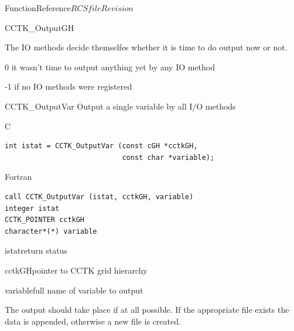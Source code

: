 \begin{cactuspart}{FunctionReference}{$RCSfile$}{$Revision$}
\begin{FunctionDescription}{CCTK\_OutputGH}
\begin{Discussion}
The IO methods decide themselfes whether it is time to do output now or not.
\end{Discussion}

\begin{ErrorSection}
\begin{Error}{\rm 0}
it wasn't time to output anything yet by any IO method
\end{Error}
\begin{Error}{-1}
if no IO methods were registered
\end{Error}
\end{ErrorSection}
\end{FunctionDescription}


\begin{FunctionDescription}{CCTK\_OutputVar}
Output a single variable by all I/O methods
\label{CCTK-OutputVar}

\begin{SynopsisSection}
\begin{Synopsis}{C}
\begin{verbatim}
int istat = CCTK_OutputVar (const cGH *cctkGH,
                            const char *variable);
\end{verbatim}
\end{Synopsis}
\begin{Synopsis}{Fortran}
\begin{verbatim}
call CCTK_OutputVar (istat, cctkGH, variable)
integer istat
CCTK_POINTER cctkGH
character*(*) variable
\end{verbatim}
\end{Synopsis}
\end{SynopsisSection}

\begin{ParameterSection}
\begin{Parameter}{istat}return status\end{Parameter}
\begin{Parameter}{cctkGH}pointer to CCTK grid hierarchy\end{Parameter}
\begin{Parameter}{variable}full name of variable to output\end{Parameter}
\end{ParameterSection}

\begin{Discussion}
The output should take place if at all possible.
If the appropriate file exists the data is appended, otherwise a new
file is created.
\end{Discussion}


\end{FunctionDescription}
\end{cactuspart}
